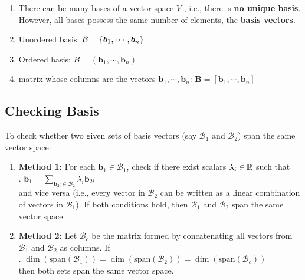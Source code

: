 \begin{enumerate}
    \item There can be many bases of a vector space $V$ , i.e., there is \textbf{no unique basis}.
    However, all bases possess the same number of elements, the \textbf{basis vectors}.
    \hfill \cite{mfml/book/mml/Deisenroth-Faisal-Ong}

    \item Unordered basis: $\mathcal{B} = \left\{\bm{b}_1, \cdots, \bm{b}_n\right\}$
    \hfill \cite{mfml/book/mml/Deisenroth-Faisal-Ong}

    \item Ordered basis: $B = (\bm{b}_1, \cdots, \bm{b}_n)$
    \hfill \cite{mfml/book/mml/Deisenroth-Faisal-Ong}

    \item matrix whose columns are the vectors $\bm{b}_1, \cdots, \bm{b}_n$: $\bm{B} = [\bm{b}_1, \cdots, \bm{b}_n]$
    \hfill \cite{mfml/book/mml/Deisenroth-Faisal-Ong}
\end{enumerate}


\subsection{Checking Basis}

To check whether two given sets of basis vectors (say $\mathcal{B}_1$ and $\mathcal{B}_2$) span the same vector space:
\hfill \cite{common/online/chatgpt}
\begin{enumerate}
    \item \textbf{Method 1:} For each $\mathbf{b}_1 \in \mathcal{B}_1$, check if there exist scalars $\lambda_i \in \mathbb{R}$ such that
    \hfill \cite{common/online/chatgpt}
    \\
    .\hfill
    $
        \mathbf{b}_1 = \sum_{\mathbf{b}_{2i} \in \mathcal{B}_2} \lambda_i \mathbf{b}_{2i}
    $
    \hfill \cite{common/online/chatgpt}
    \\
    and vice versa (i.e., every vector in $\mathcal{B}_2$ can be written as a linear combination of vectors in $\mathcal{B}_1$).
    If both conditions hold, then $\mathcal{B}_1$ and $\mathcal{B}_2$ span the same vector space.
    \hfill \cite{common/online/chatgpt}

    \item \textbf{Method 2:} Let $\mathcal{B}_c$ be the matrix formed by concatenating all vectors from $\mathcal{B}_1$ and $\mathcal{B}_2$ as columns.
    If
    \hfill \cite{common/online/chatgpt}
    \\
    .\hfill
    $
        \dim(\mathrm{span}(\mathcal{B}_1)) = \dim(\mathrm{span}(\mathcal{B}_2)) = \dim(\mathrm{span}(\mathcal{B}_c))
    $
    \hfill \cite{common/online/chatgpt}
    \\
    then both sets span the same vector space.
    \hfill \cite{common/online/chatgpt}
\end{enumerate}


